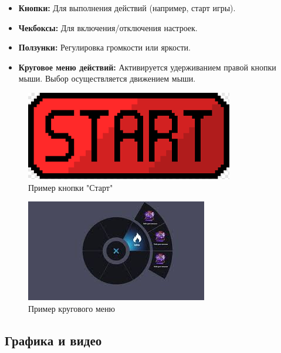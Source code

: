 \documentclass{article}
\begin{document}
		\begin{itemize}
		\item \textbf{Кнопки:} Для выполнения действий (например, старт игры).
		\item \textbf{Чекбоксы:} Для включения/отключения настроек.
		\item \textbf{Ползунки:} Регулировка громкости или яркости.
		\item \textbf{Круговое меню действий:} Активируется удерживанием правой кнопки мыши. Выбор осуществляется движением мыши.
	\end{itemize}
	\begin{figure}[h!]
		\centering
		\includegraphics[width=\textwidth]{images/startbutton.png}
		\caption{Пример кнопки "Старт"}
		\label{fig:startbutton}
	\end{figure}
	\begin{figure}[h!]
		\centering
		\includegraphics[width=\textwidth]{images/circlemenu.jpeg}
		\caption{Пример кругового меню}
		\label{fig:circlemenu}
	\end{figure}
	\newpage
	
	\subsection{Графика и видео}
\end{document}
